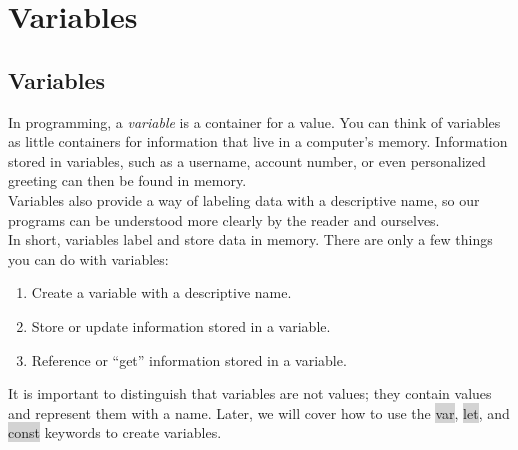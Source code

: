 \documentclass[11pt]{article}
\begin{document}
\newpage
\section{Variables}
\subsection{Variables}
In programming, a \textit{variable} is a container for a value. You can think of variables as little containers for information that live in a computer’s memory. Information stored in variables, such as a username, account number, or even personalized greeting can then be found in memory. \\
\newline
Variables also provide a way of labeling data with a descriptive name, so our programs can be understood more clearly by the reader and ourselves. \\
\newline
In short, variables label and store data in memory. There are only a few things you can do with variables: 
\begin{enumerate}[leftmargin = *]
\item Create a variable with a descriptive name.
\item Store or update information stored in a variable.
\item Reference or “get” information stored in a variable.
\end{enumerate}
It is important to distinguish that variables are not values; they contain values and represent them with a name. Later, we will cover how to use the \colorbox{lightgray}{var}, \colorbox{lightgray}{let}, and \colorbox{lightgray}{const} keywords to create variables.
\end{document}
